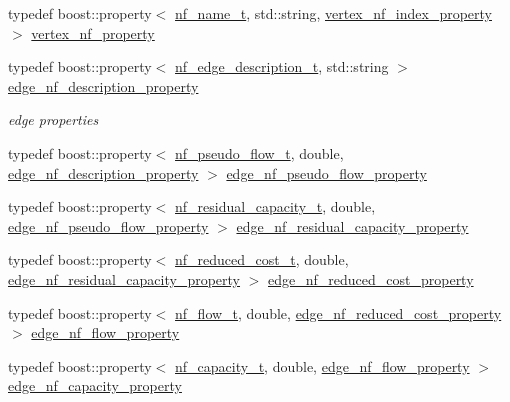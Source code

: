 \begin{DoxyCompactItemize}
\item 
typedef boost\+::property$<$ \hyperlink{structnetwork__flow_1_1nf__name__t}{nf\+\_\+name\+\_\+t}, std\+::string, \hyperlink{classnetwork__flow_a5cf2b14797e4f8b5ef2e9a83d029497c}{vertex\+\_\+nf\+\_\+index\+\_\+property} $>$ \hyperlink{classnetwork__flow_ae9862e011ed505ae9795617b0725fa9e}{vertex\+\_\+nf\+\_\+property}
\item 
typedef boost\+::property$<$ \hyperlink{structnetwork__flow_1_1nf__edge__description__t}{nf\+\_\+edge\+\_\+description\+\_\+t}, std\+::string $>$ \hyperlink{classnetwork__flow_a29cba62261c14130640a9082b9a5d70f}{edge\+\_\+nf\+\_\+description\+\_\+property}
\begin{DoxyCompactList}\small\item\em edge properties \end{DoxyCompactList}\item 
typedef boost\+::property$<$ \hyperlink{structnetwork__flow_1_1nf__pseudo__flow__t}{nf\+\_\+pseudo\+\_\+flow\+\_\+t}, double, \hyperlink{classnetwork__flow_a29cba62261c14130640a9082b9a5d70f}{edge\+\_\+nf\+\_\+description\+\_\+property} $>$ \hyperlink{classnetwork__flow_a22a6d10c77a1cfb9279a65517001e559}{edge\+\_\+nf\+\_\+pseudo\+\_\+flow\+\_\+property}
\item 
typedef boost\+::property$<$ \hyperlink{structnetwork__flow_1_1nf__residual__capacity__t}{nf\+\_\+residual\+\_\+capacity\+\_\+t}, double, \hyperlink{classnetwork__flow_a22a6d10c77a1cfb9279a65517001e559}{edge\+\_\+nf\+\_\+pseudo\+\_\+flow\+\_\+property} $>$ \hyperlink{classnetwork__flow_a240b4140cc421faeaf98d493015fd9f3}{edge\+\_\+nf\+\_\+residual\+\_\+capacity\+\_\+property}
\item 
typedef boost\+::property$<$ \hyperlink{structnetwork__flow_1_1nf__reduced__cost__t}{nf\+\_\+reduced\+\_\+cost\+\_\+t}, double, \hyperlink{classnetwork__flow_a240b4140cc421faeaf98d493015fd9f3}{edge\+\_\+nf\+\_\+residual\+\_\+capacity\+\_\+property} $>$ \hyperlink{classnetwork__flow_ad30465332300f2ca2c25289cc0548e17}{edge\+\_\+nf\+\_\+reduced\+\_\+cost\+\_\+property}
\item 
typedef boost\+::property$<$ \hyperlink{structnetwork__flow_1_1nf__flow__t}{nf\+\_\+flow\+\_\+t}, double, \hyperlink{classnetwork__flow_ad30465332300f2ca2c25289cc0548e17}{edge\+\_\+nf\+\_\+reduced\+\_\+cost\+\_\+property} $>$ \hyperlink{classnetwork__flow_a7ff9c3dbfcecece654db838d75aaea91}{edge\+\_\+nf\+\_\+flow\+\_\+property}
\item 
typedef boost\+::property$<$ \hyperlink{structnetwork__flow_1_1nf__capacity__t}{nf\+\_\+capacity\+\_\+t}, double, \hyperlink{classnetwork__flow_a7ff9c3dbfcecece654db838d75aaea91}{edge\+\_\+nf\+\_\+flow\+\_\+property} $>$ \hyperlink{classnetwork__flow_a94cd5febfd01e9a9d40fec1ce816632a}{edge\+\_\+nf\+\_\+capacity\+\_\+property}

\end{DoxyCompactItemize}
